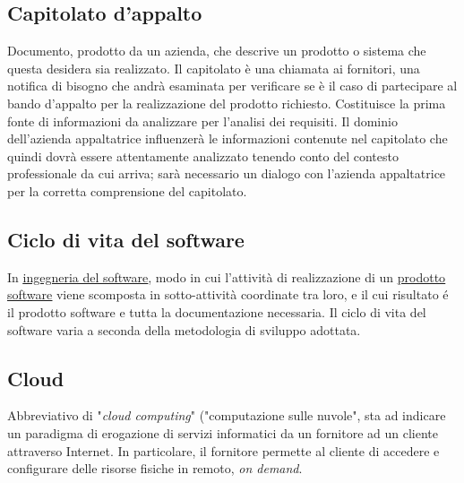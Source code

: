 	

	\subsection{Capitolato d'appalto}
	\label{sec:capitolato}
	Documento, prodotto da un azienda, che descrive un prodotto o sistema che questa desidera sia realizzato. Il capitolato è una chiamata ai fornitori, una notifica di bisogno che andrà esaminata per verificare se è il caso di partecipare al bando d'appalto per la realizzazione del prodotto richiesto. Costituisce la prima fonte di informazioni da analizzare per l'analisi dei requisiti. Il dominio dell'azienda appaltatrice influenzerà le informazioni contenute nel capitolato che quindi dovrà essere attentamente analizzato tenendo conto del contesto professionale da cui arriva; sarà necessario un dialogo con l'azienda appaltatrice per la corretta comprensione del capitolato. 
	
	\subsection{Ciclo di vita del software}
	\label{sec:ciclodivita}
	In \underline{\hyperref[sec:swe]{ingegneria del software}}, modo in cui l'attività di realizzazione di un \underline{\hyperref[sec:prodottosoftware]{prodotto software}} viene scomposta in sotto-attività coordinate tra loro, e il cui risultato é il prodotto software e tutta la documentazione necessaria. Il ciclo di vita del software varia a seconda della metodologia di sviluppo adottata.
	
		
	\subsection{Cloud}
	\label{sec:cloud}
	Abbreviativo di "\emph{cloud computing}" ("computazione sulle nuvole", sta ad indicare un paradigma di erogazione di servizi informatici da un fornitore ad un cliente attraverso Internet. In particolare, il fornitore permette al cliente di accedere e configurare delle risorse fisiche in remoto, \emph{on demand}.

